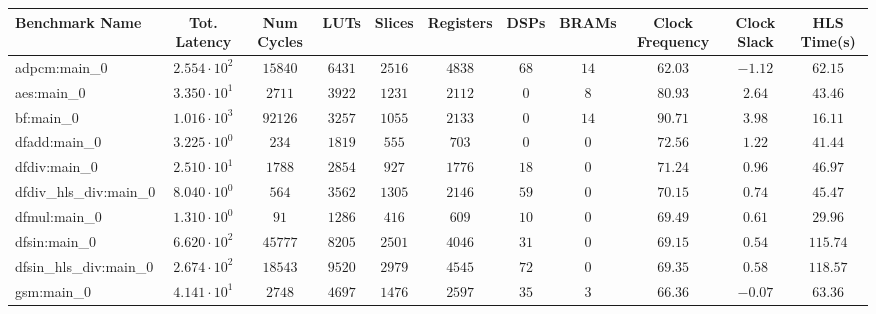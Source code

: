 \begin{tabular}{|l|c|c|c|c|c|c|c|c|c|c|}
\hline
Benchmark Name & Tot. Latency           & Num Cycles & LUTs     & Slices   & Registers & DSPs   & BRAMs  & Clock Frequency & Clock Slack & HLS Time(s) \\
\hline
adpcm:main\_0           & $ 2.554 \cdot 10^{2} $ & $ 15840  $ & $ 6431  $ & $ 2516  $ & $ 4838  $ & $ 68  $ & $ 14  $ & $ 62.03       $ & $ -1.12   $ & $ 62.15   $ \\
aes:main\_0             & $ 3.350 \cdot 10^{1} $ & $ 2711   $ & $ 3922  $ & $ 1231  $ & $ 2112  $ & $ 0   $ & $ 8   $ & $ 80.93       $ & $ 2.64    $ & $ 43.46   $ \\
bf:main\_0              & $ 1.016 \cdot 10^{3} $ & $ 92126  $ & $ 3257  $ & $ 1055  $ & $ 2133  $ & $ 0   $ & $ 14  $ & $ 90.71       $ & $ 3.98    $ & $ 16.11   $ \\
dfadd:main\_0           & $ 3.225 \cdot 10^{0} $ & $ 234    $ & $ 1819  $ & $ 555   $ & $ 703   $ & $ 0   $ & $ 0   $ & $ 72.56       $ & $ 1.22    $ & $ 41.44   $ \\
dfdiv:main\_0           & $ 2.510 \cdot 10^{1} $ & $ 1788   $ & $ 2854  $ & $ 927   $ & $ 1776  $ & $ 18  $ & $ 0   $ & $ 71.24       $ & $ 0.96    $ & $ 46.97   $ \\
dfdiv\_hls\_div:main\_0 & $ 8.040 \cdot 10^{0} $ & $ 564    $ & $ 3562  $ & $ 1305  $ & $ 2146  $ & $ 59  $ & $ 0   $ & $ 70.15       $ & $ 0.74    $ & $ 45.47   $ \\
dfmul:main\_0           & $ 1.310 \cdot 10^{0} $ & $ 91     $ & $ 1286  $ & $ 416   $ & $ 609   $ & $ 10  $ & $ 0   $ & $ 69.49       $ & $ 0.61    $ & $ 29.96   $ \\
dfsin:main\_0           & $ 6.620 \cdot 10^{2} $ & $ 45777  $ & $ 8205  $ & $ 2501  $ & $ 4046  $ & $ 31  $ & $ 0   $ & $ 69.15       $ & $ 0.54    $ & $ 115.74  $ \\
dfsin\_hls\_div:main\_0 & $ 2.674 \cdot 10^{2} $ & $ 18543  $ & $ 9520  $ & $ 2979  $ & $ 4545  $ & $ 72  $ & $ 0   $ & $ 69.35       $ & $ 0.58    $ & $ 118.57  $ \\
gsm:main\_0             & $ 4.141 \cdot 10^{1} $ & $ 2748   $ & $ 4697  $ & $ 1476  $ & $ 2597  $ & $ 35  $ & $ 3   $ & $ 66.36       $ & $ -0.07   $ & $ 63.36   $ \\

\end{tabular}
